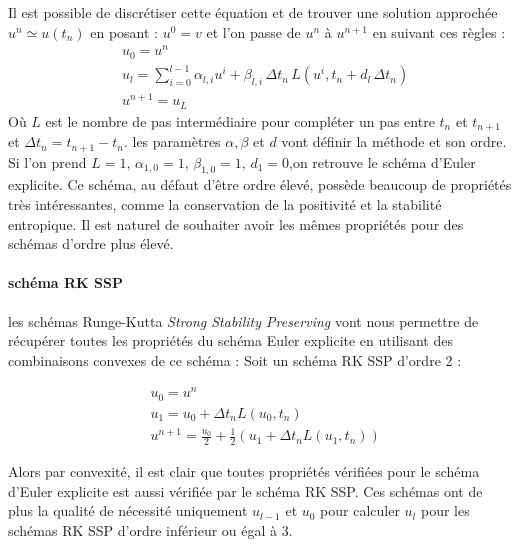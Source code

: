 Il est possible de discrétiser cette équation et de trouver une solution approchée $u^n \simeq u(t_n)$ en posant : 
$u^0= v$ et l'on passe de $u^n$ à $u^{n+1}$ en suivant ces règles : 
\begin{align*}
    &u_0 = u^n \\
    &u_l = \sum_{i=0}^{l-1} \alpha_{l,i}u^{i} +  \beta_{l,i} \,\Delta t_n \,L(u^i,t_n + d_l\, \Delta t_n) \\
    &u^{n+1} = u_{L}
\end{align*}
Où $L$ est le nombre de pas intermédiaire pour compléter un pas entre $t_n$ et $t_{n+1}$ et $\Delta t_n = t_{n+1} - t_n$.
les paramètres $\alpha,\beta$ et $d$ vont définir la méthode et son ordre. \\

Si l'on prend $L=1$, $\alpha_{1,0}=1$, $\beta_{1,0}=1$, $d_1=0$,on retrouve le schéma d’Euler explicite. Ce schéma, au défaut d’être ordre élevé, possède beaucoup de propriétés très intéressantes, comme la conservation de la positivité et la stabilité entropique. Il est naturel de souhaiter avoir les mêmes propriétés pour des schémas d’ordre plus élevé.
\paragraph{schéma RK SSP \\}

les schémas Runge-Kutta \textit{Strong Stability Preserving} vont nous permettre de récupérer toutes les propriétés du schéma Euler explicite en utilisant des combinaisons convexes de ce schéma : 
Soit un schéma RK SSP d'ordre 2 :

\begin{align*}
    &u_0 = u^n \\
    &u_1 = u_0 + \Delta t_n L(u_0,t_n) \\
    &u^{n+1} = \frac{u_0}{2} + \frac{1}{2} (u_1 + \Delta t_n L(u_1,t_n)) 
\end{align*}

\noindent Alors par convexité, il est clair que toutes propriétés vérifiées pour le schéma d'Euler explicite est aussi vérifiée par le schéma RK SSP.
Ces schémas ont de plus la qualité de nécessité uniquement $u_{l-1}$ et $u_0$ pour calculer $u_{l}$ pour les schémas RK SSP d'ordre inférieur ou égal à $3$.\\